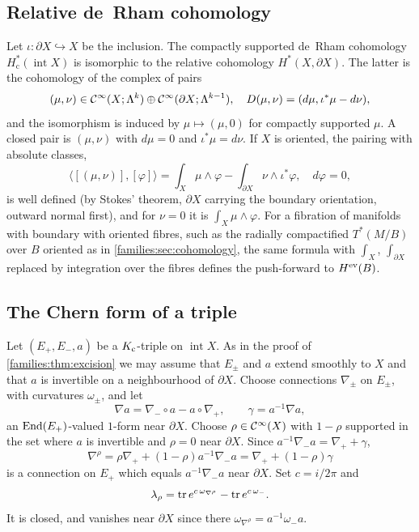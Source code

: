 \subsection{Relative de~Rham cohomology}
Let $\iota:\partial X\hookrightarrow X$ be the inclusion. The compactly
supported de~Rham cohomology $H^*_{\mathrm c}(\operatorname{int}X)$ is
isomorphic to the relative cohomology $H^*(X,\partial X)$. The latter is the
cohomology of the complex of pairs
\begin{equation*}
  (\mu,\nu)\in\mathcal{C}^\infty(X;\Lambda^k)\oplus\mathcal{C}^\infty(\partial X;\Lambda^{k-1}),\quad
  D(\mu,\nu)=(d\mu,\iota^*\mu-d\nu),
\end{equation*}
and the isomorphism is induced by $\mu\mapsto(\mu,0)$ for compactly supported
$\mu$. A closed pair is $(\mu,\nu)$ with $d\mu=0$ and $\iota^*\mu=d\nu$. If
$X$ is oriented, the
pairing with absolute classes,
\begin{equation}\label{families:eq:rel-pairing}
  \langle[(\mu,\nu)],[\varphi]\rangle=\int_X\mu\wedge\varphi-\int_{\partial
  X}\nu\wedge\iota^*\varphi,\quad d\varphi=0,
\end{equation}
is well defined (by Stokes' theorem, $\partial X$ carrying the boundary
orientation, outward normal first), and for $\nu=0$ it is $\int_X\mu\wedge\varphi$.
For a fibration of manifolds with boundary with oriented fibres, such as the
radially compactified $T^*(M/B)$ over $B$ oriented as in
\cref{families:sec:cohomology}, the same formula with $\int_X$, $\int_{\partial X}$
replaced by integration over the fibres defines the push-forward to $H^{\mathrm{ev}}(B)$.

\subsection{The Chern form of a triple}
Let $(E_+,E_-,a)$ be a $K_{\mathrm{c}}$-triple on $\operatorname{int}X$. As in the proof
of \cref{families:thm:excision} we may assume that $E_\pm$ and $a$ extend
smoothly to $X$ and that $a$ is invertible on a neighbourhood of $\partial X$.
Choose connections $\nabla_\pm$ on $E_\pm$, with curvatures $\omega_\pm$, and
let
\begin{equation*}
  \nabla a=\nabla_-\circ a-a\circ\nabla_+,\qquad\gamma=a^{-1}\nabla a,
\end{equation*}
an $\operatorname{End}(E_+)$-valued $1$-form near $\partial X$. Choose $\rho\in\mathcal{C}^\infty(X)$ with
$1-\rho$ supported in the set where $a$ is invertible and $\rho=0$ near
$\partial X$. Since $a^{-1}\nabla_-a=\nabla_++\gamma$,
\begin{equation}\label{families:eq:nabla-rho}
  \nabla^\rho=\rho\nabla_++(1-\rho)a^{-1}\nabla_-a=\nabla_++(1-\rho)\gamma
\end{equation}
is a connection on $E_+$ which equals $a^{-1}\nabla_-a$ near $\partial X$. Set
$c=i/2\pi$ and
\begin{equation}\label{families:eq:lambda-rho}
  \lambda_\rho=\operatorname{tr} e^{c\,\omega_{\nabla^\rho}}-\operatorname{tr} e^{c\,\omega_-}.
\end{equation}
It is closed, and vanishes near $\partial X$ since there $\omega_{\nabla^\rho}=
a^{-1}\omega_-a$.


